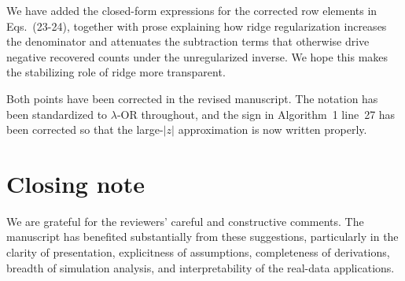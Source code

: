 \documentclass[onecolumn,11pt]{IEEEtran}
\begin{document}
We have added the closed-form expressions for the corrected row elements in Eqs.~(23-24), together with prose explaining how ridge regularization increases the denominator and attenuates the subtraction terms that otherwise drive negative recovered counts under the unregularized inverse. We hope this makes the stabilizing role of ridge more transparent.

Both points have been corrected in the revised manuscript. The notation has been standardized to $\lambda$-OR throughout, and the sign in Algorithm~1 line~27 has been corrected so that the large-$|z|$ approximation is now written properly.

\section*{Closing note}

We are grateful for the reviewers' careful and constructive comments. The manuscript has benefited substantially from these suggestions, particularly in the clarity of presentation, explicitness of assumptions, completeness of derivations, breadth of simulation analysis, and interpretability of the real-data applications.







%
%
\end{document}
